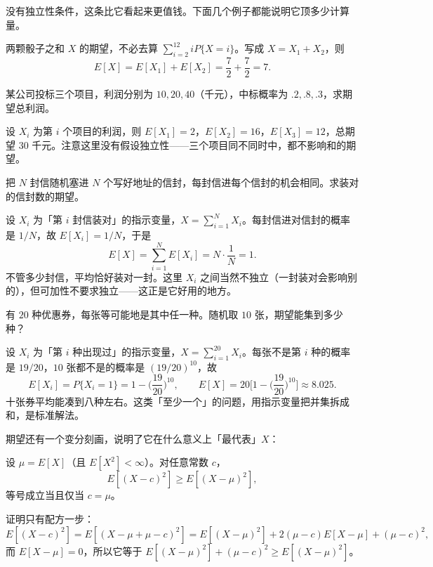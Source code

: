 没有独立性条件，这条比它看起来更值钱。下面几个例子都能说明它顶多少计算量。

\begin{example}[两颗骰子之和]
两颗骰子之和 $X$ 的期望，不必去算 $\sum_{i=2}^{12}iP\{X=i\}$。写成 $X=X_1+X_2$，则
\[
E[X]=E[X_1]+E[X_2]=\frac72+\frac72=7 .
\]
\end{example}

\begin{example}[三份投标]
某公司投标三个项目，利润分别为 $10,20,40$（千元），中标概率为 $.2,.8,.3$，求期望总利润。
\end{example}

设 $X_i$ 为第 $i$ 个项目的利润，则 $E[X_1]=2$，$E[X_2]=16$，$E[X_3]=12$，总期望 $30$ 千元。注意这里没有假设独立性——三个项目同不同时中，都不影响和的期望。

\begin{example}[匹配问题]
把 $N$ 封信随机塞进 $N$ 个写好地址的信封，每封信进每个信封的机会相同。求装对的信封数的期望。
\end{example}

设 $X_i$ 为「第 $i$ 封信装对」的指示变量，$X=\sum_{i=1}^NX_i$。每封信进对信封的概率是 $1/N$，故 $E[X_i]=1/N$，于是
\[
E[X]=\sum_{i=1}^NE[X_i]=N\cdot\frac1N=1 .
\]
不管多少封信，平均恰好装对一封。这里 $X_i$ 之间当然不独立（一封装对会影响别的），但可加性不要求独立——这正是它好用的地方。

\begin{example}[优惠券种类]
有 $20$ 种优惠券，每张等可能地是其中任一种。随机取 $10$ 张，期望能集到多少种？
\end{example}

设 $X_i$ 为「第 $i$ 种出现过」的指示变量，$X=\sum_{i=1}^{20}X_i$。每张不是第 $i$ 种的概率是 $19/20$，$10$ 张都不是的概率是 $(19/20)^{10}$，故
\[
E[X_i]=P\{X_i=1\}=1-\Big(\frac{19}{20}\Big)^{10},
\qquad
E[X]=20\Big[1-\Big(\frac{19}{20}\Big)^{10}\Big]\approx 8.025 .
\]
十张券平均能凑到八种左右。这类「至少一个」的问题，用指示变量把并集拆成和，是标准解法。

期望还有一个变分刻画，说明了它在什么意义上「最代表」$X$：

\begin{proposition}[均值是最佳常数预测]
设 $\mu=E[X]$（且 $E[X^2]<\infty$）。对任意常数 $c$，
\[
E[(X-c)^2]\ge E[(X-\mu)^2],
\]
等号成立当且仅当 $c=\mu$。
\end{proposition}

证明只有配方一步：
\[
E[(X-c)^2]=E[(X-\mu+\mu-c)^2]=E[(X-\mu)^2]+2(\mu-c)E[X-\mu]+(\mu-c)^2,
\]
而 $E[X-\mu]=0$，所以它等于 $E[(X-\mu)^2]+(\mu-c)^2\ge E[(X-\mu)^2]$。

